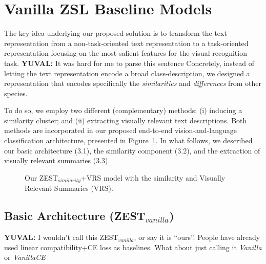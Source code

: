 \documentclass[11pt,a4paper]{article}
\newcommand\yuval[1]{\textcolor{darkpink}{\textbf{YUVAL:} #1 }}
\begin{document}

\section{Vanilla ZSL Baseline Models}
\label{task}

The key idea underlying our proposed solution is to transform the text representation from a non-task-oriented text representation to a task-oriented representation focusing on the most salient features for the visual recognition task. \yuval{It was hard for me to parse this sentence}
Concretely, instead of letting the text representation encode a broad class-description, we designed a representation that encodes specifically the {\em similarities} and {\em differences} from other species. 

To do so, we employ two different (complementary) methods: (i)  inducing a similarity cluster; and (ii)  extracting visually relevant text descriptions. Both methods are incorporated in our proposed end-to-end vision-and-language classification architecture, presented in Figure~\ref{fig:model}. In what follows, we described our basic architecture (3.1), the similarity component (3.2), and the extraction of visually relevant summaries (3.3).


\begin{figure}[th]
\centering
{}
 \caption{Our ZEST$_{similarity}$+VRS model with the similarity and Visually Relevant Summaries (VRS).}
\label{fig:model}
\end{figure}
\subsection{Basic Architecture (ZEST$_{vanilla}$)}
\yuval{I wouldn't call this ZEST$_{vanilla}$, or say it is ``ours''. People have already used linear compatibility+CE loss as baselines. What about just calling it \textit{Vanilla} or \textit{VanillaCE}}
\end{document}
